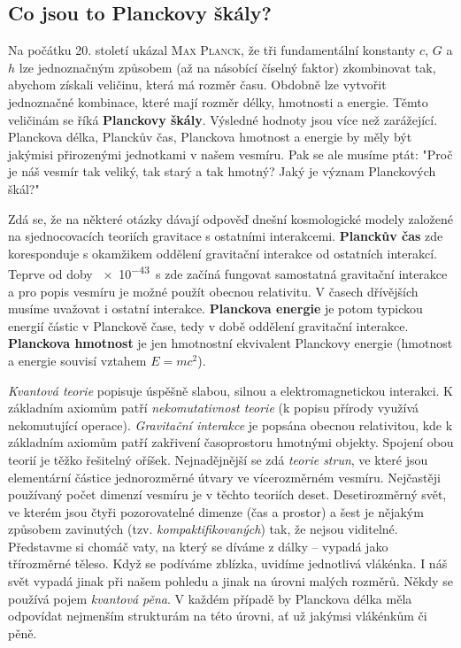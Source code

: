     \subsection{Co jsou to Planckovy škály?}\label{fyz:IchapIsecIXssecI}
      Na počátku 20. století ukázal \textsc{Max Planck}, že tři fundamentální konstanty \(c\), \(G\)
      a \(h\) lze jednoznačným způsobem (až na násobící číselný faktor) zkombinovat tak, abychom
      získali veličinu, která má rozměr času. Obdobně lze vytvořit jednoznačné kombinace, které mají
      rozměr délky, hmotnosti a energie. Těmto veličinám se říká \textbf{Planckovy škály}. Výsledné
      hodnoty jsou více než zarážející. Planckova délka, Planckův čas, Planckova hmotnost a energie
      by měly být jakýmisi přirozenými jednotkami v našem vesmíru. Pak se ale musíme ptát: "Proč je
      náš vesmír tak veliký, tak starý a tak hmotný? Jaký je význam Planckových škál?"

      Zdá se, že na některé otázky dávají odpověď dnešní kosmologické modely založené na
      sjednocovacích teoriích gravitace s ostatními interakcemi. \textbf{Planckův čas} zde
      koresponduje s okamžikem oddělení gravitační interakce od ostatních interakcí. Teprve od doby
      \SI{e-43}{\s} zde začíná fungovat samostatná gravitační interakce a pro popis vesmíru je možné
      použít obecnou relativitu. V časech dřívějších musíme uvažovat i ostatní interakce.
      \textbf{Planckova energie} je potom typickou energií částic v Planckově čase, tedy v době
      oddělení gravitační interakce. \textbf{Planckova hmotnost} je jen hmotnostní ekvivalent
      Planckovy energie (hmotnost a energie souvisí vztahem \(E = mc^2\)).
      
      \emph{Kvantová teorie} popisuje úspěšně slabou, silnou a elektromagnetickou interakci. K
      základním axiomům patří \emph{nekomutativnost teorie} (k popisu přírody využívá nekomutující
      operace). \emph{Gravitační interakce} je popsána obecnou relativitou, kde k základním axiomům
      patří zakřivení časoprostoru hmotnými objekty. Spojení obou teorií je těžko řešitelný oříšek.
      Nejnadějnější se zdá \emph{teorie strun}, ve které jsou elementární částice jednorozměrné
      útvary ve vícerozměrném vesmíru. Nejčastěji používaný počet dimenzí vesmíru je v těchto
      teoriích deset. Desetirozměrný svět, ve kterém jsou čtyři pozorovatelné dimenze (čas a
      prostor) a šest je nějakým způsobem zavinutých (tzv. \emph{kompaktifikovaných}) tak, že nejsou
      viditelné. Představme si chomáč vaty, na který se díváme z dálky – vypadá jako třírozměrné
      těleso. Když se podíváme zblízka, uvidíme jednotlivá vlákénka. I náš svět vypadá jinak při
      našem pohledu a jinak na úrovni malých rozměrů. Někdy se používá pojem \emph{kvantová pěna}. V
      každém případě by Planckova délka měla odpovídat nejmenším strukturám na této úrovni, ať už
      jakýmsi vlákénkům či pěně.
      
